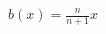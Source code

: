 \begin{solution}{6.108}

\end{solution}
\begin{solution}{6.109}

\end{solution}
\begin{solution}{6.110}

\end{solution}
\begin{solution}{6.111}

\end{solution}
\begin{solution}{6.112}

\end{solution}
\begin{solution}{6.113}
\end{solution}
\begin{solution}{6.114}

\end{solution}
\begin{solution}{6.115}

\end{solution}
\begin{solution}{6.116}

\end{solution}
\begin{solution}{6.117}

\end{solution}
\begin{solution}{6.118}

\end{solution}
\begin{solution}{6.119}

\end{solution}
\begin{solution}{6.120}
$b(x)=\frac{n}{n+1}x$
\end{solution}
\begin{solution}{6.121}

\end{solution}
\begin{solution}{6.122}

\end{solution}
\begin{solution}{7.1}

\end{solution}
\begin{solution}{7.2}

\end{solution}
